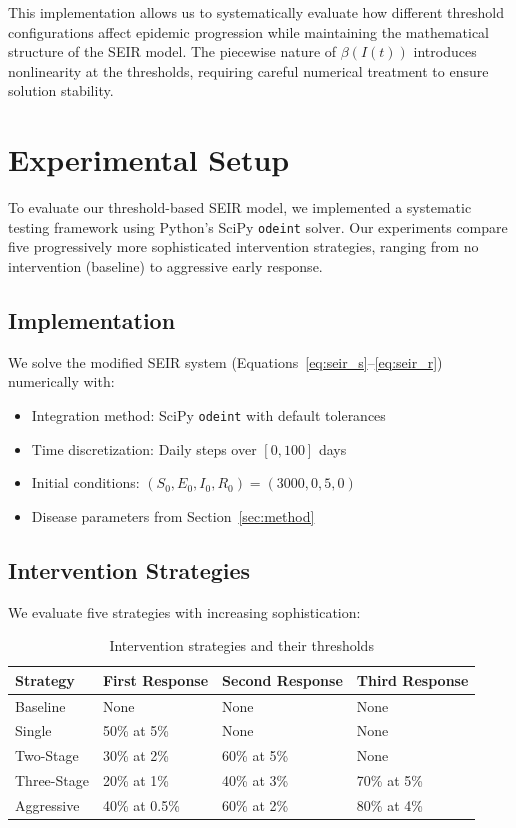 \documentclass{article} %
\begin{document}
This implementation allows us to systematically evaluate how different threshold configurations affect epidemic progression while maintaining the mathematical structure of the SEIR model. The piecewise nature of $\beta(I(t))$ introduces nonlinearity at the thresholds, requiring careful numerical treatment to ensure solution stability.

\section{Experimental Setup}
\label{sec:experimental}

To evaluate our threshold-based SEIR model, we implemented a systematic testing framework using Python's SciPy {\tt odeint} solver. Our experiments compare five progressively more sophisticated intervention strategies, ranging from no intervention (baseline) to aggressive early response.

\subsection{Implementation}
We solve the modified SEIR system (Equations~\ref{eq:seir_s}--\ref{eq:seir_r}) numerically with:
\begin{itemize}
    \item Integration method: SciPy {\tt odeint} with default tolerances
    \item Time discretization: Daily steps over $[0,100]$ days
    \item Initial conditions: $(S_0,E_0,I_0,R_0)=(3000,0,5,0)$
    \item Disease parameters from Section~\ref{sec:method}
\end{itemize}

\subsection{Intervention Strategies}
We evaluate five strategies with increasing sophistication:
\begin{table}[h]
\centering
\caption{Intervention strategies and their thresholds}
\label{tab:strategies}
\begin{tabular}{llll}
\toprule
Strategy & First Response & Second Response & Third Response \\
\midrule
Baseline & None & None & None \\
Single & 50\% at 5\% & None & None \\
Two-Stage & 30\% at 2\% & 60\% at 5\% & None \\
Three-Stage & 20\% at 1\% & 40\% at 3\% & 70\% at 5\% \\
Aggressive & 40\% at 0.5\% & 60\% at 2\% & 80\% at 4\% \\
\bottomrule
\end{tabular}
\end{table}
\end{document}
